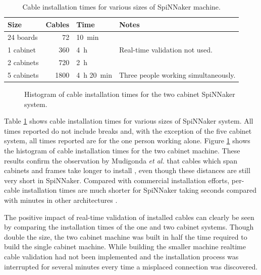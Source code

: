 			\begin{table}
				\center
				\begin{tabular}{lrll}
					\toprule
						Size & Cables & Time & Notes \\
					\midrule
						24 boards  & \num{72}   & \SI{10}{\minute} & \\
						1 cabinet  & \num{360}  & \SI{4}{\hour} &
							Real-time validation not used. \\
						2 cabinets & \num{720}  & \SI{2}{\hour} & \\
						5 cabinets & \num{1800} & \SI{4}{\hour} \SI{20}{\minute} &
							Three people working simultaneously. \\
					\bottomrule
				\end{tabular}
				
				\caption{Cable installation times for various sizes of SpiNNaker
				machine.}
				\label{tab:install-time}
			\end{table}
			
			\begin{figure}
				
				\caption{Histogram of cable installation times for the two cabinet
				SpiNNaker system.}
				\label{fig:install-histogram}
			\end{figure}
			
			Table \ref{tab:install-time} shows cable installation times for various
			sizes of SpiNNaker system. All times reported do not include breaks and,
			with the exception of the five cabinet system, all times reported are for
			the one person working alone.  Figure \ref{fig:install-histogram} shows
			the histogram of cable installation times for the two cabinet machine.
			These results confirm the observation by Mudigonda \emph{et al.} that
			cables which span cabinets and frames take longer to install
			\cite{mudigonda11}, even though these distances are still very short in
			SpiNNaker. Compared with commercial installation efforts, per-cable
			installation times are much shorter for SpiNNaker taking seconds compared
			with minutes in other architectures \cite{mudigonda11}.
			
			The positive impact of real-time validation of installed cables can
			clearly be seen by comparing the installation times of the one and two
			cabinet systems. Though double the size, the two cabinet machine was
			built in half the time required to build the single cabinet machine.
			While building the smaller machine realtime cable validation had not been
			implemented and the installation process was interrupted for several
			minutes every time a misplaced connection was discovered.
			
